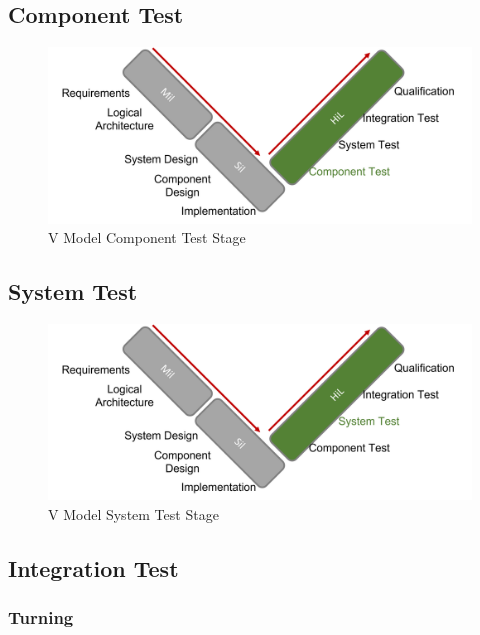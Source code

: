 \subsection{Component Test}
\begin{figure}[h!]
    \begin{center}
    \includegraphics[width=12cm]{Pictures/V Model Component Test.png}
    \caption[V Model Component Test]{V Model Component Test Stage}
    \label{V Model Component Test}
    \end{center}
\end{figure}

\subsection{System Test}
\begin{figure}[h!]
    \begin{center}
    \includegraphics[width=12cm]{Pictures/V Model System Test.png}
    \caption[V Model System Test]{V Model System Test Stage}
    \label{V Model System Test}
    \end{center}
\end{figure}

\subsection{Integration Test}
\subsubsection{Turning}
